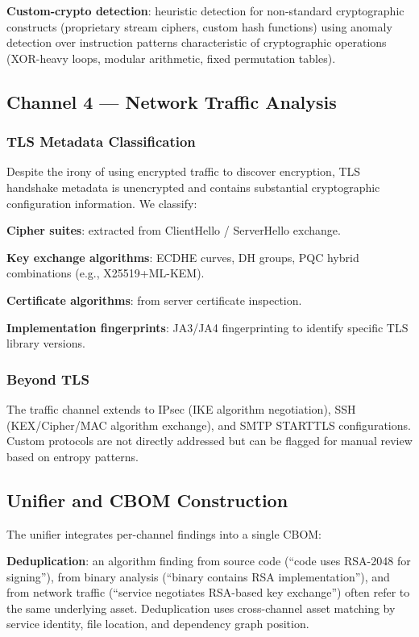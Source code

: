 \documentclass[sigconf,nonacm]{acmart}
\begin{document}
\textbf{Custom-crypto detection}: heuristic detection for
non-standard cryptographic constructs (proprietary stream ciphers,
custom hash functions) using anomaly detection over instruction
patterns characteristic of cryptographic operations (XOR-heavy
loops, modular arithmetic, fixed permutation tables).

\subsection{Channel 4 --- Network Traffic Analysis}

\subsubsection{TLS Metadata Classification}

Despite the irony of using encrypted traffic to discover encryption,
TLS handshake metadata is unencrypted and contains substantial
cryptographic configuration information. We classify:

\textbf{Cipher suites}: extracted from ClientHello / ServerHello
exchange.

\textbf{Key exchange algorithms}: ECDHE curves, DH groups,
PQC hybrid combinations (e.g., X25519+ML-KEM).

\textbf{Certificate algorithms}: from server certificate inspection.

\textbf{Implementation fingerprints}: JA3/JA4 fingerprinting to
identify specific TLS library versions.

\subsubsection{Beyond TLS}

The traffic channel extends to IPsec (IKE algorithm negotiation),
SSH (KEX/Cipher/MAC algorithm exchange), and SMTP STARTTLS
configurations. Custom protocols are not directly addressed but
can be flagged for manual review based on entropy patterns.

\subsection{Unifier and CBOM Construction}

The unifier integrates per-channel findings into a single CBOM:

\textbf{Deduplication}: an algorithm finding from source code
(``code uses RSA-2048 for signing''), from binary analysis
(``binary contains RSA implementation''), and from network traffic
(``service negotiates RSA-based key exchange'') often refer to the
same underlying asset. Deduplication uses cross-channel asset
matching by service identity, file location, and dependency graph
position.
\end{document}
